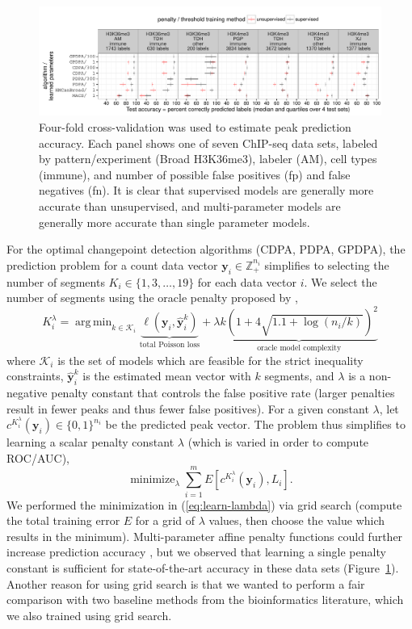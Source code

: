 \documentclass[twoside,11pt]{article}
\DeclareMathOperator*{\argmin}{arg\,min}
\DeclareMathOperator*{\minimize}{minimize}
\newcommand{\ZZ}{\mathbb Z}
\begin{document}
\begin{figure}[t!]
  \centering 
  \includegraphics[width=\textwidth]{figure-test-error-dots-parameters}
  \vskip -0.5cm
  \caption{Four-fold cross-validation was used to estimate peak
    prediction accuracy. Each panel shows one of seven ChIP-seq data
    sets, labeled by pattern/experiment (Broad H3K36me3), labeler
    (AM), cell types (immune), and number of possible false positives
    (fp) and false negatives (fn). It is clear that supervised models
    are generally more accurate than unsupervised, and multi-parameter
    models are generally more accurate than single parameter models. }
  \label{fig:test-error-dots}
\end{figure}

For the optimal changepoint detection algorithms (CDPA, PDPA, GPDPA),
the prediction problem for a count data vector
$\mathbf y_i\in\ZZ_+^{n_i}$ simplifies to selecting the number of
segments $K_i\in \{1, 3,\dots, 19\}$ for each data vector $i$.
We select the number of segments
using the oracle penalty proposed by \citet{cleynen2013segmentation},
\begin{equation}
  K_i^\lambda=\argmin_{k\in \mathcal K_i} \underbrace{\ell(\mathbf y_i, \mathbf{\hat y}^k_i)}_{\text{total Poisson loss}} 
+ \lambda 
\underbrace{
k\left(
1 + 4\sqrt{1.1 + \log( n_i/k)}
\right)^2
}_{\text{
oracle model complexity
}}
\end{equation}
where $\mathcal K_i$ is the set of models which are feasible for the
strict inequality constraints, $\mathbf{\hat y}^k_i$ is the estimated
mean vector with $k$ segments, and $\lambda$ is a non-negative penalty
constant that controls the false positive rate (larger penalties
result in fewer peaks and thus fewer false positives). For a given
constant $\lambda$, let $c^{K_i^\lambda}(\mathbf y_i)\in\{0,1\}^{n_i}$
be the predicted peak vector. The problem thus simplifies to learning
a scalar penalty constant $\lambda$ (which is varied in order to
compute ROC/AUC),
\begin{equation}
  \label{eq:learn-lambda}
  \minimize_{\lambda}
  \sum_{i=1}^m E\left[
    c^{K_i^\lambda}(\mathbf y_i), 
    L_i\right].
\end{equation}
We performed the minimization in
(\ref{eq:learn-lambda}) via grid search (compute the total training error $E$
for a grid of $\lambda$ values, then choose the value which results in
the minimum). Multi-parameter affine penalty functions could further
increase prediction accuracy \citep{HOCKING-penalties}, but we
observed that learning a single penalty constant is sufficient for
state-of-the-art accuracy in these data sets
(Figure~\ref{fig:test-error-dots}). Another reason for using grid
search is that we wanted to perform a fair comparison with two
baseline methods from the bioinformatics literature, which we also
trained using grid search.
\end{document}
